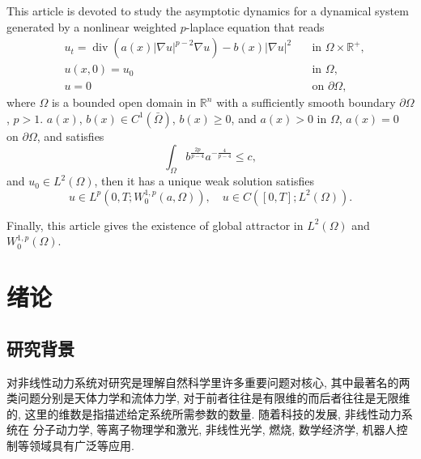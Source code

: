 \documentclass[oneside,longtitle]{LZUthesis}
\theoremstyle{definition}
\numberwithin{equation}{chapter}
\newcommand*\abs[1]{\lvert#1\rvert}
\newcommand\R{\mathbb{R}}
\DeclareMathOperator{\Div}{div}
\begin{document}

\begin{englishabstract}
	This article is devoted to study the asymptotic dynamics for a dynamical system generated by a nonlinear
	weighted $p$-laplace equation that reads
	\begin{equation}\label{eq:main}
		\begin{alignedat}{2}
			& u_t = \Div(a(x)\abs{\nabla u}^{p-2}\nabla u) - b(x)\abs{\nabla u}^2 \quad &\text{in } \Omega \times \R^+,\\
			& u(x,0) = u_0 \quad &\text{in } \Omega,\\
			& u = 0 \quad &\text{on } \partial\Omega,
		\end{alignedat}
	\end{equation}
	where $\Omega$ is a bounded open domain in $\R^{n}$ with a sufficiently smooth boundary $\partial\Omega$, $p>1$.
	$ a(x)$, $b(x) \in C^1(\bar{\Omega}) $, $b(x) \geq 0$, and $a(x) > 0$ in $\Omega$, $a(x) = 0$ on $\partial\Omega$, and satisfies
	\begin{equation}
		\int_{\Omega} b^{\frac{2p}{p-4}}a^{-\frac{4}{p-4}} \leq c,
	\end{equation}
	and $u_0 \in L^2(\Omega) $, then it has a unique weak solution satisfies
	\begin{equation}
	u \in L^p(0, T; W_0^{1,p}(a,\Omega)), \quad u \in C([0, T]; L^2(\Omega)).
	\end{equation}

	Finally, this article gives the existence of global attractor in $L^2(\Omega)$ and $W_0^{1,p}(\Omega)$.
\end{englishabstract}


\tableofcontents{}


\mainmatter

\pagestyle{lzu}


\chapter{绪论}
\section{研究背景}
对非线性动力系统对研究是理解自然科学里许多重要问题对核心,
其中最著名的两类问题分别是天体力学和流体力学,
对于前者往往是有限维的而后者往往是无限维的,
这里的维数是指描述给定系统所需参数的数量.
随着科技的发展, 非线性动力系统在
分子动力学, 等离子物理学和激光, 非线性光学, 燃烧, 数学经济学, 机器人控制等领域具有广泛等应用.
\end{document}
